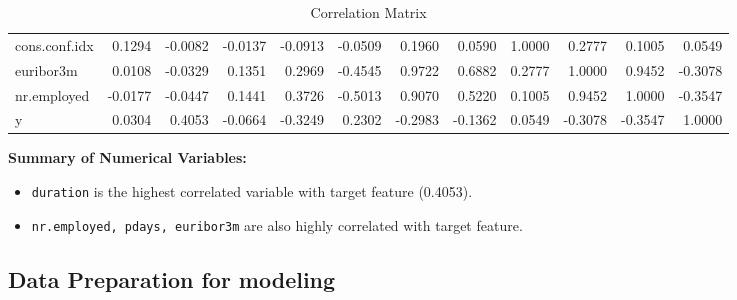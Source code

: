 \documentclass[11pt,a4paper]{article}
\begin{document}
\begin{table}[h]
{\begin{tabular}{l||rrrrrrrrrrr}
                cons.conf.idx  &  0.1294 &   -0.0082 &   -0.0137 & -0.0913 &   -0.0509 &        0.1960 &          0.0590 &         1.0000 &     0.2777 &       0.1005 &  0.0549 \\
                euribor3m      &  0.0108 &   -0.0329 &    0.1351 &  0.2969 &   -0.4545 &        0.9722 &          0.6882 &         0.2777 &     1.0000 &       0.9452 & -0.3078 \\
                nr.employed    & -0.0177 &   -0.0447 &    0.1441 &  0.3726 &   -0.5013 &        0.9070 &          0.5220 &         0.1005 &     0.9452 &       1.0000 & -0.3547 \\
                y              &  0.0304 &    0.4053 &   -0.0664 & -0.3249 &    0.2302 &       -0.2983 &         -0.1362 &         0.0549 &    -0.3078 &      -0.3547 &  1.0000 \\
            \end{tabular}
        }
        \caption{Correlation Matrix}
        \label{tab:corr_mat}
    \end{table}

    \noindent
    \textbf{Summary of Numerical Variables:}
    \begin{itemize}
        \item \texttt{duration} is the highest correlated variable with target feature (0.4053).
        \item \texttt{nr.employed, pdays, euribor3m} are also highly correlated with target feature.
    \end{itemize}
    
    
    \newpage
    \subsection{Data Preparation for modeling}
\end{document}
